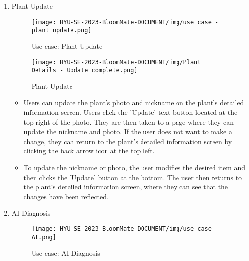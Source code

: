 \documentclass[conference, a4paper]{IEEEtran}
\begin{document}
\begin{enumerate}
    \item  Plant Update
         \begin{figure}[h]
        \centering
        \texttt{[image: HYU-SE-2023-BloomMate-DOCUMENT/img/use case - plant update.png]}
        \caption{Use case: Plant Update}
        \label{fig:Plant Update}
        \end{figure}
        
        \begin{figure}[h]
        \centering
        \texttt{[image: HYU-SE-2023-BloomMate-DOCUMENT/img/Plant Details - Update complete.png]}
        \caption{Plant Update}
        \label{fig:Plant Update}
        \end{figure}
    \begin{itemize}
        \item Users can update the plant's photo and nickname on the plant's detailed information screen. Users click the 'Update' text button located at the top right of the photo. They are then taken to a page where they can update the nickname and photo. If the user does not want to make a change, they can return to the plant's detailed information screen by clicking the back arrow icon at the top left.
        \item To update the nickname or photo, the user modifies the desired item and then clicks the 'Update' button at the bottom. The user then returns to the plant's detailed information screen, where they can see that the changes have been reflected.
    \end{itemize}
    
    \item AI Diagnosis
        \begin{figure}[h]
        \centering
        \texttt{[image: HYU-SE-2023-BloomMate-DOCUMENT/img/use case - AI.png]}
        \caption{Use case: AI Diagnosis}
        \label{fig}
        \end{figure}
        

\end{enumerate}
\end{document}
